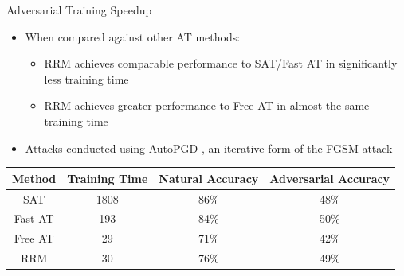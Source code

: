 \documentclass{beamer}
\begin{document}

\begin{frame}{Adversarial Training Speedup}
	
	
	\begin{itemize}
		\item When compared against other AT methods:
		\begin{itemize}
			\item RRM achieves comparable performance to SAT/Fast AT in significantly less training time
			\item RRM achieves greater performance to Free AT in almost the same training time
		\end{itemize}
		\item Attacks conducted using AutoPGD \cite{croce2020reliable}, an iterative form of the FGSM attack \cite{goodfellow2014explaining}
	\end{itemize}
	
	\begin{center}
		\begin{tabular}{ |c|c|c|c| } 
			\hline
			Method & Training Time & Natural Accuracy & Adversarial Accuracy \\
			\hline
			SAT & 1808 & 86\% & 48\% \\
			Fast AT & 193 & 84\% & 50\% \\
			Free AT & 29 & 71\% & 42\% \\
			RRM & 30 & 76\% & 49\% \\
			\hline
		\end{tabular}
	\end{center}
	
\end{frame}

\end{document}
